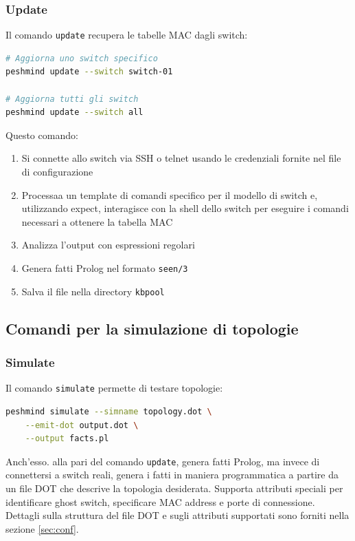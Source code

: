 \documentclass[12pt,a4paper]{article}
\begin{document}
\subsubsection{Update}

Il comando \texttt{update} recupera le tabelle MAC dagli switch: \\

\begin{lstlisting}[language=bash]
# Aggiorna uno switch specifico
peshmind update --switch switch-01

# Aggiorna tutti gli switch
peshmind update --switch all
\end{lstlisting}

Questo comando:
\begin{enumerate}
    \item Si connette allo switch via SSH o telnet usando le credenziali fornite nel file di configurazione
    \item Processaa un template di comandi specifico per il modello di switch e, utilizzando expect, interagisce con la shell dello switch per eseguire i comandi necessari a ottenere la tabella MAC
    \item Analizza l'output con espressioni regolari
    \item Genera fatti Prolog nel formato \texttt{seen/3}
    \item Salva il file nella directory \texttt{kbpool}
\end{enumerate}

\subsection{Comandi per la simulazione di topologie}

\subsubsection{Simulate}

Il comando \texttt{simulate} permette di testare topologie:

\begin{lstlisting}[language=bash]
peshmind simulate --simname topology.dot \
    --emit-dot output.dot \
    --output facts.pl
\end{lstlisting}

Anch'esso. alla pari del comando \texttt{update}, genera fatti Prolog, ma invece di connettersi a switch reali,
genera i fatti in maniera programmatica a partire da un file DOT che descrive la topologia desiderata. Supporta
attributi speciali per identificare ghost switch, specificare MAC address e porte di connessione. Dettagli sulla
struttura del file DOT e sugli attributi supportati sono forniti nella sezione \ref{sec:conf}.
\end{document}
